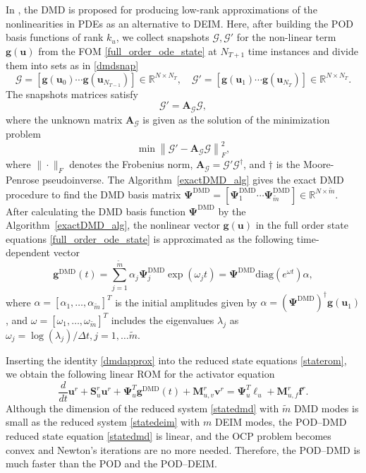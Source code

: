 \documentclass[preprint,12pt]{elsarticle}
\begin{document}
In \cite{Alla16}, the DMD is proposed for producing low-rank
approximations of the nonlinearities in PDEs as an alternative to DEIM. Here, after building the POD basis functions of rank $k_u$,
we collect snapshots  ${\mathcal G}, {\mathcal G}'$  for the  non-linear term ${\bm g}(\bm{u})$ from the FOM \eqref{full_order_ode_state} at $N_{T+1}$ time instances and divide them into sets as in \eqref{dmdsnap}
$$
{\mathcal G} = [ {\bm g}(\bm{u}_0) \cdots {\bm g}(\bm{u}_{N_{T-1}}) ]\in\mathbb{R}^{N\times N_T}, \quad   {\mathcal G}'   = [ {\bm g}(\bm{u}_1) \cdots {\bm g}(\bm{u}_{N_T}) ]\in\mathbb{R}^{N\times N_T}.
$$
The snapshots matrices satisfy
$$
{\mathcal G }' = {\bm A}_{\mathcal G}   {\mathcal G },
$$
where the unknown matrix ${\bm A}_{\mathcal G}$ is given as the solution of the minimization problem
\begin{equation*}
\min   \left\| {\mathcal G }' -   {\bm A}_{\mathcal G}{\mathcal G }\right\|_{F}^2,
\end{equation*}
where $\|\cdot\|_F$ denotes the Frobenius norm, ${\bm A}_{\mathcal G} = {\mathcal G}'  {\mathcal G}^{\dag}$,
and $\dag$ is the Moore-Penrose pseudoinverse. The Algorithm~\ref{exactDMD_alg} gives the exact DMD procedure \cite{Tu14} to find the DMD basis matrix $\bm{\Psi}^{\text{DMD}}=[\bm{\Psi}^{\text{DMD}}_1 \cdots  \bm{\Psi}^{\text{DMD}}_{\widetilde{m}}]\in\mathbb{R}^{N\times \widetilde{m}}$.
After calculating the DMD basis function $\bm{\Psi}^{\text{DMD}}$ by the Algorithm~\ref{exactDMD_alg},  the nonlinear vector ${\bm g}(\bm{u})$ in the full order state equations \eqref{full_order_ode_state} is approximated as the following time-dependent vector
\begin{equation}\label{dmdapprox}
 \bm{g}^{\text{DMD}}(t) = \sum_{j=1}^{\widetilde{m}}\alpha_j\bm{\Psi}_j^{\text{DMD}} \exp(\omega_ j t) = \bm{\Psi}^{\text{DMD}}\text{diag}(e^{\omega t})\alpha ,
 \end{equation}
 where $\alpha=[\alpha_1,\ldots, \alpha_{\widetilde{m}}]^T$  is the initial amplitudes given by $\alpha = (\bm{\Psi}^{\text{DMD}})^{\dag}{\bm g}(\bm{u}_1)$,  and $\omega =[\omega_1,\ldots, \omega_{\widetilde{m}}]^T$ includes the eigenvalues $\lambda_j$ as $\omega_j=\log{(\lambda_j)}/\Delta t, j=1,\ldots \widetilde{m}$.


Inserting the identity \eqref{dmdapprox} into the reduced state equations \eqref{staterom}, we obtain the following linear ROM for the activator equation
\begin{equation}\label{statedmd}
 \frac{d}{dt} \bm{u}^r +  \bm{S}^r_u \bm{u}^r + \bm{\Psi}_u^T \bm{g}^{\text{DMD}}(t)
  + \bm{M}_{u,v}^r \bm{v}^r  =  \bm{\Psi}_u^T \bm{\ell}_u + \bm{M}_{u,f}^r \bm{f}^r.
\end{equation}
Although the dimension of the reduced system \eqref{statedmd} with $\widetilde{m}$  DMD modes is  small as the reduced system \eqref{statedeim} with $m$ DEIM modes, the POD--DMD reduced state equation \eqref{statedmd} is linear, and the OCP problem becomes convex and Newton's iterations are no more needed.  Therefore, the POD--DMD is much faster than the POD and the POD--DEIM.
\end{document}
